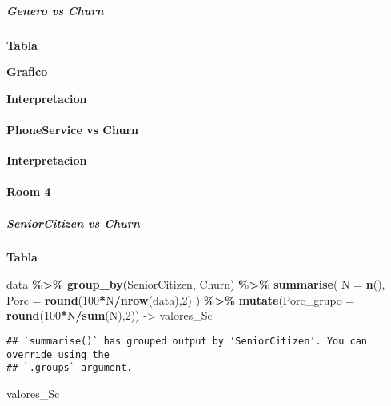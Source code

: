 \documentclass[
]{article}
\newenvironment{Shaded}{\begin{snugshade}}{\end{snugshade}}
\newcommand{\AttributeTok}[1]{\textcolor[rgb]{0.13,0.29,0.53}{#1}}
\newcommand{\DecValTok}[1]{\textcolor[rgb]{0.00,0.00,0.81}{#1}}
\newcommand{\FunctionTok}[1]{\textcolor[rgb]{0.13,0.29,0.53}{\textbf{#1}}}
\newcommand{\NormalTok}[1]{#1}
\newcommand{\OtherTok}[1]{\textcolor[rgb]{0.56,0.35,0.01}{#1}}
\newcommand{\SpecialCharTok}[1]{\textcolor[rgb]{0.81,0.36,0.00}{\textbf{#1}}}
\begin{document}
\hypertarget{genero-vs-churn}{%
\subparagraph{Genero vs Churn}\label{genero-vs-churn}}

\textbf{Tabla}

\textbf{Grafico}

\textbf{Interpretacion}

\hypertarget{phoneservice-vs-churn}{%
\paragraph{PhoneService vs Churn}\label{phoneservice-vs-churn}}

\textbf{Interpretacion}

\hypertarget{room-4}{%
\paragraph{Room 4}\label{room-4}}

\hypertarget{seniorcitizen-vs-churn}{%
\subparagraph{SeniorCitizen vs Churn}\label{seniorcitizen-vs-churn}}

\textbf{Tabla}

\begin{Shaded}
\begin{Highlighting}[]
\NormalTok{data }\SpecialCharTok{\%\textgreater{}\%}
  \FunctionTok{group\_by}\NormalTok{(SeniorCitizen, Churn) }\SpecialCharTok{\%\textgreater{}\%}
  \FunctionTok{summarise}\NormalTok{(}
    \AttributeTok{N =} \FunctionTok{n}\NormalTok{(),}
    \AttributeTok{Porc =} \FunctionTok{round}\NormalTok{(}\DecValTok{100}\SpecialCharTok{*}\NormalTok{N}\SpecialCharTok{/}\FunctionTok{nrow}\NormalTok{(data),}\DecValTok{2}\NormalTok{)}
\NormalTok{  ) }\SpecialCharTok{\%\textgreater{}\%}
  \FunctionTok{mutate}\NormalTok{(}\AttributeTok{Porc\_grupo =} \FunctionTok{round}\NormalTok{(}\DecValTok{100}\SpecialCharTok{*}\NormalTok{N}\SpecialCharTok{/}\FunctionTok{sum}\NormalTok{(N),}\DecValTok{2}\NormalTok{)) }\OtherTok{{-}\textgreater{}}\NormalTok{ valores\_Sc}
\end{Highlighting}
\end{Shaded}

\begin{verbatim}
## `summarise()` has grouped output by 'SeniorCitizen'. You can override using the
## `.groups` argument.
\end{verbatim}

\begin{Shaded}
\begin{Highlighting}[]
\NormalTok{valores\_Sc}
\end{Highlighting}
\end{Shaded}
\end{document}
